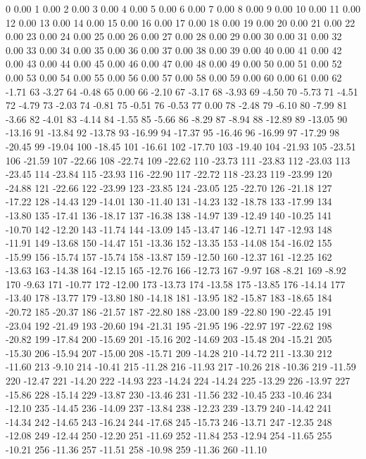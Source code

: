 0 0.00
1 0.00
2 0.00
3 0.00
4 0.00
5 0.00
6 0.00
7 0.00
8 0.00
9 0.00
10 0.00
11 0.00
12 0.00
13 0.00
14 0.00
15 0.00
16 0.00
17 0.00
18 0.00
19 0.00
20 0.00
21 0.00
22 0.00
23 0.00
24 0.00
25 0.00
26 0.00
27 0.00
28 0.00
29 0.00
30 0.00
31 0.00
32 0.00
33 0.00
34 0.00
35 0.00
36 0.00
37 0.00
38 0.00
39 0.00
40 0.00
41 0.00
42 0.00
43 0.00
44 0.00
45 0.00
46 0.00
47 0.00
48 0.00
49 0.00
50 0.00
51 0.00
52 0.00
53 0.00
54 0.00
55 0.00
56 0.00
57 0.00
58 0.00
59 0.00
60 0.00
61 0.00
62 -1.71
63 -3.27
64 -0.48
65 0.00
66 -2.10
67 -3.17
68 -3.93
69 -4.50
70 -5.73
71 -4.51
72 -4.79
73 -2.03
74 -0.81
75 -0.51
76 -0.53
77 0.00
78 -2.48
79 -6.10
80 -7.99
81 -3.66
82 -4.01
83 -4.14
84 -1.55
85 -5.66
86 -8.29
87 -8.94
88 -12.89
89 -13.05
90 -13.16
91 -13.84
92 -13.78
93 -16.99
94 -17.37
95 -16.46
96 -16.99
97 -17.29
98 -20.45
99 -19.04
100 -18.45
101 -16.61
102 -17.70
103 -19.40
104 -21.93
105 -23.51
106 -21.59
107 -22.66
108 -22.74
109 -22.62
110 -23.73
111 -23.83
112 -23.03
113 -23.45
114 -23.84
115 -23.93
116 -22.90
117 -22.72
118 -23.23
119 -23.99
120 -24.88
121 -22.66
122 -23.99
123 -23.85
124 -23.05
125 -22.70
126 -21.18
127 -17.22
128 -14.43
129 -14.01
130 -11.40
131 -14.23
132 -18.78
133 -17.99
134 -13.80
135 -17.41
136 -18.17
137 -16.38
138 -14.97
139 -12.49
140 -10.25
141 -10.70
142 -12.20
143 -11.74
144 -13.09
145 -13.47
146 -12.71
147 -12.93
148 -11.91
149 -13.68
150 -14.47
151 -13.36
152 -13.35
153 -14.08
154 -16.02
155 -15.99
156 -15.74
157 -15.74
158 -13.87
159 -12.50
160 -12.37
161 -12.25
162 -13.63
163 -14.38
164 -12.15
165 -12.76
166 -12.73
167 -9.97
168 -8.21
169 -8.92
170 -9.63
171 -10.77
172 -12.00
173 -13.73
174 -13.58
175 -13.85
176 -14.14
177 -13.40
178 -13.77
179 -13.80
180 -14.18
181 -13.95
182 -15.87
183 -18.65
184 -20.72
185 -20.37
186 -21.57
187 -22.80
188 -23.00
189 -22.80
190 -22.45
191 -23.04
192 -21.49
193 -20.60
194 -21.31
195 -21.95
196 -22.97
197 -22.62
198 -20.82
199 -17.84
200 -15.69
201 -15.16
202 -14.69
203 -15.48
204 -15.21
205 -15.30
206 -15.94
207 -15.00
208 -15.71
209 -14.28
210 -14.72
211 -13.30
212 -11.60
213 -9.10
214 -10.41
215 -11.28
216 -11.93
217 -10.26
218 -10.36
219 -11.59
220 -12.47
221 -14.20
222 -14.93
223 -14.24
224 -14.24
225 -13.29
226 -13.97
227 -15.86
228 -15.14
229 -13.87
230 -13.46
231 -11.56
232 -10.45
233 -10.46
234 -12.10
235 -14.45
236 -14.09
237 -13.84
238 -12.23
239 -13.79
240 -14.42
241 -14.34
242 -14.65
243 -16.24
244 -17.68
245 -15.73
246 -13.71
247 -12.35
248 -12.08
249 -12.44
250 -12.20
251 -11.69
252 -11.84
253 -12.94
254 -11.65
255 -10.21
256 -11.36
257 -11.51
258 -10.98
259 -11.36
260 -11.10
